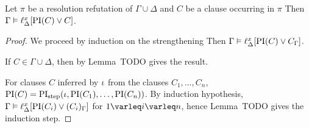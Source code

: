 \begin{lemma}
	\label{lemma:gamma_entails_lifted_interpolant}
	Let $\pi$ be a resolution refutation of $\Gamma \cup \Delta$ and $C$ be a clause occurring in $\pi$
	Then $\Gamma \entails \lifdelta{\PI(C) \lor\nolinebreak C}$.
\end{lemma}
\begin{proof}
	We proceed by induction on the strengthening
	Then $\Gamma \entails \lifdelta{\PI(C) \lor\nolinebreak C_\Gamma}$.

	If $C \in \Gamma\cup\Delta$, then by Lemma~TODO gives the result.

	For clauses $C$ inferred by $\iota$ from the clauses $C_1, \dots, C_n$, $\operatorname{PI}(C) = \operatorname{PI}_{\mathrm{step}}(\iota, \operatorname{PI}(C_1), \dots, \operatorname{PI}(C_n))$.
	By induction hypothesis, $\Gamma \entails \lifdelta{\PI(C_i) \lor\nolinebreak (C_i)_\Gamma}$ for $1\varleq i\varleq n$, hence
	Lemma~TODO gives the induction step.
\end{proof}


